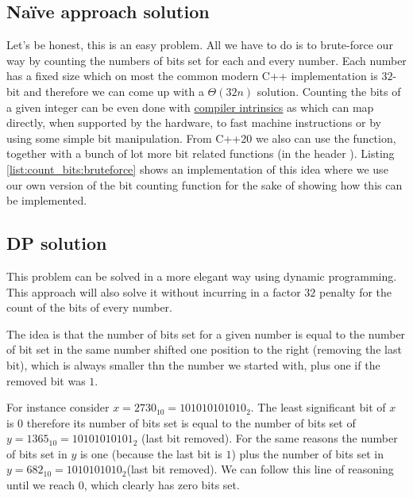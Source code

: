 \subsection{Na\"ive approach solution}
\label{count_bits:sec:bruteforce}
Let's be honest, this is an easy problem.
All we have to do is to brute-force our way by counting the numbers of bits set for each and every number.
Each number has a fixed size which on most the common modern C++ implementation is $32$-bit 
and therefore we can come up with a $\Theta(32n)$ solution. 
Counting the bits of a given integer can be even done with \href{https://gcc.gnu.org/onlinedocs/gcc-4.9.2/gcc/X86-Built-in-Functions.html}{compiler intrinsics} as 
which can map directly, when supported by the hardware, to fast machine instructions or by using some simple bit manipulation. 
From C++20 we also can use the  function, together with a bunch of lot more bit related functions (in the header ).
Listing \ref{list:count_bits:bruteforce} shows an implementation of this idea where we use our own version of the bit counting function  for the sake of showing how this can be implemented.



\subsection{DP solution}
\label{count_bits:sec:dp}
This problem can be solved in a more elegant way using dynamic programming. This approach will also 
solve it without incurring in a factor $32$ penalty for the count of the bits of every number.

The idea is that the number of bits set for a given number is equal to the number of bit set in the same number shifted one position to the right
(removing the last bit), which is always smaller thn the number we started with, plus one if the removed bit was $1$.

For instance consider $x=2730_{10} = 101010101010_2$. The least significant bit of $x$ is $0$ therefore its number of bits set is equal to
the number of bits set of $y=1365_{10} = 10101010101_2$ (last bit removed).
For the same reasons the number of bits set in $y$ is one (because the last bit is $1$) plus the number of bits set in $y=682_{10} = 1010101010_2$(last bit removed).
We can follow this line of reasoning until we reach $0$, which clearly has zero bits set.

